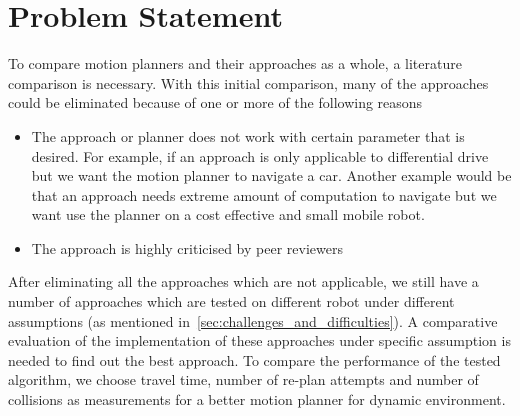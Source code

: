 \section{Problem Statement}
\label{sec:problem_statement}
To compare motion planners and their approaches as a whole, a literature comparison is necessary.
With this initial comparison, many of the approaches could be eliminated because of one or more of
the following reasons
\begin{itemize}
    \item The approach or planner does not work with certain parameter that is desired. For example, 
        if an approach is only applicable to differential drive but we want the motion planner to 
        navigate a car. Another example would be that an approach needs extreme amount of computation
        to navigate but we want use the planner on a cost effective and small mobile robot.
    \item The approach is highly criticised by peer reviewers
\end{itemize} 
After eliminating all the approaches which are not applicable, we still have a number of approaches
which are tested on different robot under different assumptions (as mentioned in~\ref{sec:challenges_and_difficulties}).
A comparative evaluation of the implementation of these approaches under specific assumption is 
needed to find out the best approach. To compare the performance of the tested algorithm, we choose
travel time, number of re-plan attempts and number of collisions as measurements for a better motion
planner for dynamic environment.

